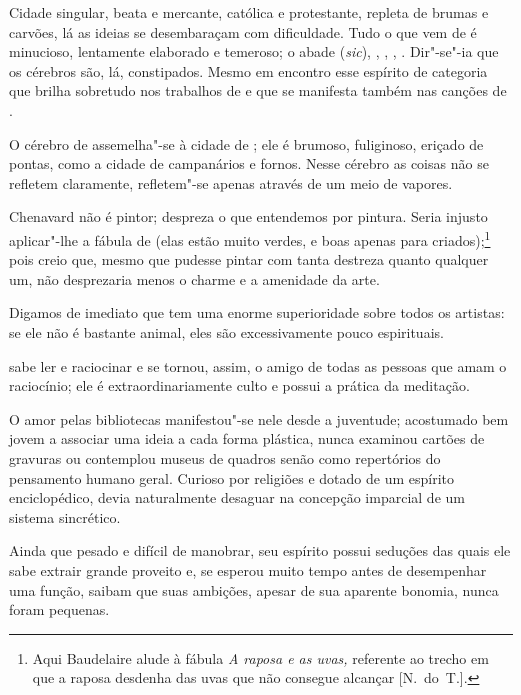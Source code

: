 Cidade singular, beata e mercante, católica e protestante, repleta de
brumas e carvões, lá as ideias se desembaraçam com dificuldade. Tudo
o que vem de  é minucioso, lentamente elaborado e temeroso; o abade
 (\textit{sic}), , , , . Dir"-se"-ia
que os cérebros são, lá, constipados. Mesmo em  encontro esse
espírito de categoria que brilha sobretudo nos trabalhos de  e
que se manifesta também nas canções de .

O cérebro de  assemelha"-se à cidade de ; ele é brumoso,
fuliginoso, eriçado de pontas, como a cidade de campanários e fornos.
Nesse cérebro as coisas não se refletem claramente, refletem"-se apenas
através de um meio de vapores.

Chenavard não é pintor; despreza o que entendemos por pintura. Seria
injusto aplicar"-lhe a fábula de  (elas estão muito verdes, e
boas apenas para criados);\footnote{ Aqui Baudelaire alude à fábula 
\textit{A raposa e as uvas, }referente ao trecho em que a raposa
desdenha das uvas que não consegue alcançar [N.~do~T.].} pois creio
que, mesmo que  pudesse pintar com tanta destreza quanto
qualquer um, não desprezaria menos o charme e a amenidade da arte.

Digamos de imediato que  tem uma enorme superioridade sobre
todos os artistas: se ele não é bastante animal, eles são
excessivamente pouco espirituais.

 sabe ler e raciocinar e se tornou, assim, o amigo de todas as
pessoas que amam o raciocínio; ele é extraordinariamente culto e possui
a prática da meditação.

O amor pelas bibliotecas manifestou"-se nele desde a juventude;
acostumado bem jovem a associar uma ideia a cada forma plástica, nunca
examinou cartões de gravuras ou contemplou museus de quadros senão como
repertórios do pensamento humano geral. Curioso por religiões e dotado
de um espírito enciclopédico, devia naturalmente desaguar na concepção
imparcial de um sistema sincrético.

Ainda que pesado e difícil de manobrar, seu espírito possui seduções das
quais ele sabe extrair grande proveito e, se esperou muito tempo antes
de desempenhar uma função, saibam que suas ambições, apesar de sua
aparente bonomia, nunca foram pequenas.

